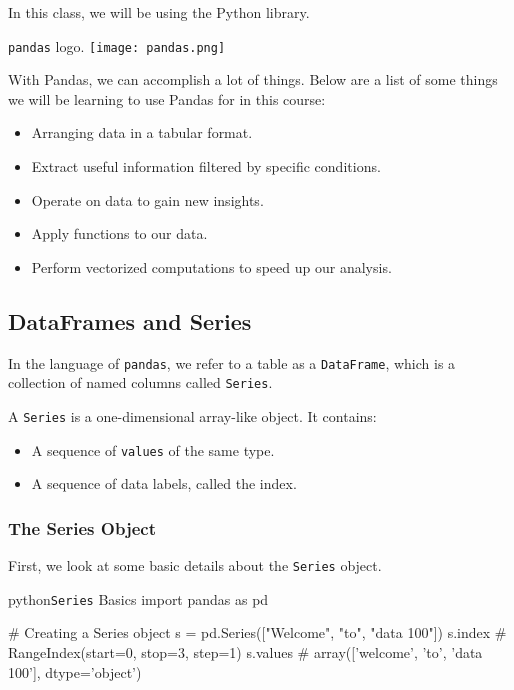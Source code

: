 \documentclass[openany]{book}
\begin{document}
In this class, we will be using the Python  library.
\begin{figurebox}{\texttt{pandas} logo.}
	\centering\texttt{[image: pandas.png]}
\end{figurebox}

With Pandas, we can accomplish a lot of things. Below are a list of some things we will be learning to use Pandas for in this course:
\begin{itemize}
	\item Arranging data in a tabular format.
	\item Extract useful information filtered by specific conditions.
	\item Operate on data to gain new insights.
	\item Apply  functions to our data.
	\item Perform vectorized computations to speed up our analysis.
\end{itemize}

\subsection{DataFrames and Series}
\begin{defn}[DataFrames]\label{def: DataFrames}
	In the language of \texttt{pandas}, we refer to a table as a \texttt{DataFrame}, which is a collection of named columns called \texttt{Series}.
\end{defn}

\begin{defn}[Series]\label{def: Series}
	A \texttt{Series} is a one-dimensional array-like object. It contains:
	\begin{itemize}
		\item A sequence of \texttt{values} of the same type.
		\item A sequence of data labels, called the index.
	\end{itemize}
\end{defn}

\subsubsection{The Series Object}
First, we look at some basic details about the \texttt{Series} object.

\begin{code}{python}{\texttt{Series} Basics}
import pandas as pd

# Creating a Series object
s = pd.Series(["Welcome", "to", "data 100"])
s.index # RangeIndex(start=0, stop=3, step=1)
s.values # array(['welcome', 'to', 'data 100'], dtype='object')
\end{code}
\end{document}
